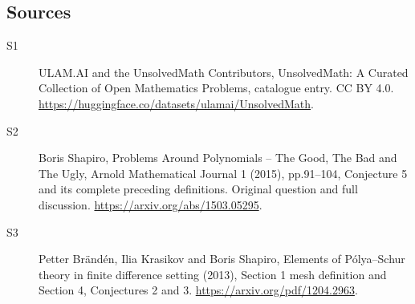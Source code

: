 \documentclass[11pt]{article}
\begin{document}
\subsection{Sources}
\begin{description}
\item[\hypertarget{source:statement:1}{S1}] ULAM.AI and the UnsolvedMath Contributors, UnsolvedMath: A Curated Collection of Open Mathematics Problems, catalogue entry. CC BY 4.0. \url{https://huggingface.co/datasets/ulamai/UnsolvedMath}.
\item[\hypertarget{source:statement:2}{S2}] Boris Shapiro, Problems Around Polynomials -- The Good, The Bad and The Ugly, Arnold Mathematical Journal 1 (2015), pp.91--104, Conjecture 5 and its complete preceding definitions. Original question and full discussion. \url{https://arxiv.org/abs/1503.05295}.
\item[\hypertarget{source:statement:3}{S3}] Petter Brändén, Ilia Krasikov and Boris Shapiro, Elements of Pólya--Schur theory in finite difference setting (2013), Section 1 mesh definition and Section 4, Conjectures 2 and 3. \url{https://arxiv.org/pdf/1204.2963}.
\end{description}
\label{end:statement}
\end{document}
